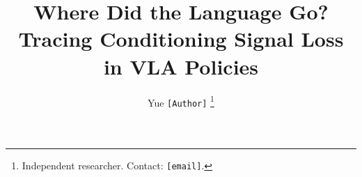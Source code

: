 \documentclass[conference]{IEEEtran}
\title{\LARGE \bf
Where Did the Language Go? \\
Tracing Conditioning Signal Loss in VLA Policies
}
\author{Yue \texttt{[Author]}%
\thanks{Independent researcher. Contact: \texttt{[email]}.}%
}
\begin{document}
\maketitle
\thispagestyle{empty}
\pagestyle{empty}

\begin{abstract}

\end{abstract}











\end{document}
